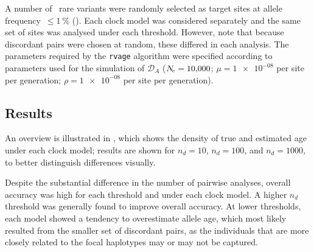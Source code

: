A number of ~rare variants were randomly selected as target sites at allele frequency~${\leq \SI{1}{\percent}}$ (\fk{[2,20]}).
Each clock model was considered separately and the same set of sites was analysed under each threshold.
However, note that because discordant pairs were chosen at random, these differed in each analysis.
The parameters required by the \texttt{rvage} algorithm were specified according to parameters used for the simulation of $\mathcal{D}_A$ (${N_{\!e} = \num{10000}}$; ${\mu = \num{1e-08}}$ per site per generation; ${\rho = \num{1e-08}}$ per site per generation).


%
\subsection{Results}
%


An overview is illustrated in , which shows the density of true and estimated age under each clock model; results are shown for ${n_d = \num{10}}$, ${n_d = \num{100}}$, and ${n_d = \num{1000}}$, to better distinguish differences visually.


%

%

Despite the substantial difference in the number of pairwise analyses, overall accuracy was high for each threshold and under each clock model.
A higher $n_d$ threshold was generally found to improve overall accuracy.
At lower thresholds, each model showed a tendency to overestimate allele age, which most likely resulted from the smaller set of discordant pairs, as the individuals that are more closely related to the focal haplotypes may or may not be captured.


